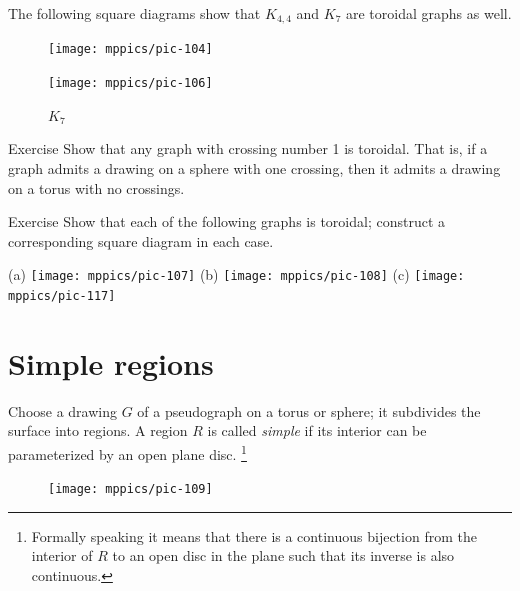 The following square diagrams show that $K_{4,4}$ and $K_7$ are toroidal graphs as well.

\begin{figure}[h!]
\begin{minipage}{.48\textwidth}
\centering
\texttt{[image: mppics/pic-104]}
\end{minipage}\hfill
\begin{minipage}{.48\textwidth}
\centering
\texttt{[image: mppics/pic-106]}\label{K5-toroidal}
\end{minipage}

\medskip

\begin{minipage}{.45\textwidth}
\centering
\caption*{$K_{4,4}$}
\end{minipage}\hfill
\begin{minipage}{.45\textwidth}
\centering
\caption*{$K_7$}
\end{minipage}
\vskip-4mm
\end{figure}




\begin{thm}{Exercise}
Show that any graph with crossing number 1 is toroidal.
That is, if a graph admits a drawing on a sphere with one crossing, then it admits a drawing on a torus with no crossings.
\end{thm}


\begin{thm}{Exercise}
Show that each of the following graphs is toroidal; construct a corresponding square diagram in each case.

(a) \texttt{[image: mppics/pic-107]}
(b) \texttt{[image: mppics/pic-108]}
(c) \texttt{[image: mppics/pic-117]}
\end{thm}


\section*{Simple regions}

Choose a drawing $G$ of a pseudograph on a torus or sphere;
it subdivides the surface into regions.
A region $R$ is called \emph{simple} if its interior can be parameterized by an open plane disc.%
\footnote{Formally speaking it means that there is a continuous bijection from the interior of $R$ to an open disc in the plane such that its inverse is also continuous.}

\begin{figure}
\vskip-4mm
\centering
\texttt{[image: mppics/pic-109]}
\end{figure}

